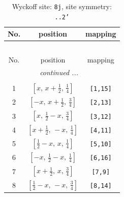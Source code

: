 \documentclass[fleqn,8pt]{jsarticle}
\begin{document}
\begin{longtable}{ccc}
\caption{Wyckoff site: {\tt 8j}, site symmetry: {\tt ..2'}}
 \\
 \hline \hline
No. & position & mapping \\ \hline \endfirsthead

\multicolumn{2}{l}{\tablename\ \thetable{}} \\
 \hline \hline
No. & position & mapping \\ \hline \endhead

 \hline \hline
\multicolumn{2}{r}{\footnotesize\it continued ...} \\ \endfoot

 \hline \hline
\multicolumn{2}{r}{} \\ \endlastfoot

1 & $\left[ x,\, x + \frac{1}{2},\, \frac{1}{4} \right]$ & {\tt [1,15]} \\ \hline
2 & $\left[ - x,\, x + \frac{1}{2},\, \frac{3}{4} \right]$ & {\tt [2,13]} \\ \hline
3 & $\left[ x,\, \frac{1}{2} - x,\, \frac{3}{4} \right]$ & {\tt [3,12]} \\ \hline
4 & $\left[ x + \frac{1}{2},\, - x,\, \frac{1}{4} \right]$ & {\tt [4,11]} \\ \hline
5 & $\left[ \frac{1}{2} - x,\, x,\, \frac{1}{4} \right]$ & {\tt [5,10]} \\ \hline
6 & $\left[ - x,\, \frac{1}{2} - x,\, \frac{1}{4} \right]$ & {\tt [6,16]} \\ \hline
7 & $\left[ x + \frac{1}{2},\, x,\, \frac{3}{4} \right]$ & {\tt [7,9]} \\ \hline
8 & $\left[ \frac{1}{2} - x,\, - x,\, \frac{3}{4} \right]$ & {\tt [8,14]} \\
\end{longtable}
\renewcommand{\arraystretch}{1.2}
\end{document}

